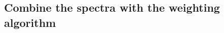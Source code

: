 




\subsection{Combine the spectra with the weighting algorithm} 
\label{sec:weighting_algorithm}

